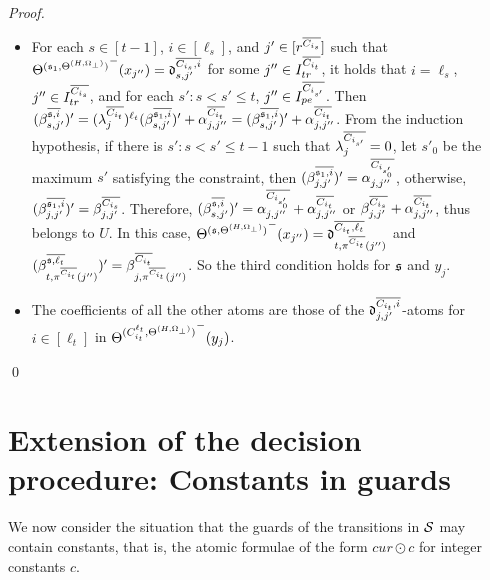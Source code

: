 \begin{appendix}
\begin{proof}
\begin{itemize}
	\item For each $s \in [t-1]$, $i \in [\ell_s]$, and $j' \in [r^{\overline{C_{i_s}}}]$ such that ${\Theta^{({\mathfrak{s} }_1,\Theta^{(H,\Omega_\bot)})}}^-(x_{j''}) = \mathfrak{d}^{\overline{C_{i_s}, i}}_{s, j'}$ for some $j'' \in I^{\overline{C_{i_t}}}_{tr}$, it holds that $i = \ell_s$, $j'' \in I^{\overline{C_{i_s}}}_{tr}$, and for each $s': s < s' \le t$, $j'' \in I^{\overline{C_{i_{s'}}}}_{pe}$. Then $(\beta^{\overline{{\mathfrak{s} },i}}_{s,j'})' =(\lambda^{\overline{C_{i_t}}}_{j})^{\ell_t}  (\beta^{\overline{{\mathfrak{s} }_1, i}}_{s, j'})' + \alpha^{\overline{C_{i_t}}}_{j, j''}  =  (\beta^{\overline{{\mathfrak{s} }_1, i}}_{s, j'})' + \alpha^{\overline{C_{i_t}}}_{j, j''}$. From the induction hypothesis,  if there is $s': s < s' \le t-1$ such that $\lambda^{\overline{C_{i_{s'}}}}_j =0$, let $s'_0$ be the maximum $s'$ satisfying the constraint, then $(\beta^{\overline{{\mathfrak{s} }_1, i}}_{j,j'})'=\alpha^{\overline{C_{i_{s'_0}}}}_{j, j''}$, otherwise, $(\beta^{\overline{{\mathfrak{s} }_1, i}}_{j,j'})'= \beta^{\overline{C_{i_s}}}_{j,j'}$. Therefore, $(\beta^{\overline{{\mathfrak{s} },i}}_{s,j'})' = \alpha^{\overline{C_{i_{s'_0}}}}_{j, j''} + \alpha^{\overline{C_{i_t}}}_{j, j''}$ or $\beta^{\overline{C_{i_s}}}_{j,j'} + \alpha^{\overline{C_{i_t}}}_{j, j''}$, thus belongs to $U$. In this case, ${\Theta^{({\mathfrak{s} },\Theta^{(H,\Omega_\bot)})}}^-(x_{j''})=\mathfrak{d}^{\overline{C_{i_t},\ell_t}}_{t, \pi^{\overline{C_{i_t}}}(j'')}$ and $(\beta^{\overline{{\mathfrak{s} },\ell_t}}_{t, \pi^{\overline{C_{i_t}}}(j'')})' = \beta^{\overline{C_{i_t}}}_{j, \pi^{\overline{C_{i_t}}}(j'')}$. So the third condition holds for ${\mathfrak{s} }$ and $y_j$.
	\item The coefficients of all the other atoms are those of  the $\mathfrak{d}^{\overline{C_{i_t}, i}}_{j, j'}$-atoms for $i \in [\ell_t]$ in ${\Theta^{(C^{\ell_t}_{i_t},\Theta^{(H,\Omega_\bot)})}}^-(y_j)$.
\end{itemize} \qed

\end{proof}


\section{Extension of the decision procedure: Constants in guards}

We now consider the situation that the guards of the transitions in ${\mathcal{S} }$ may contain constants, that is, the atomic formulae of the form $cur \odot c$ for integer constants $c$. 


\end{appendix}

